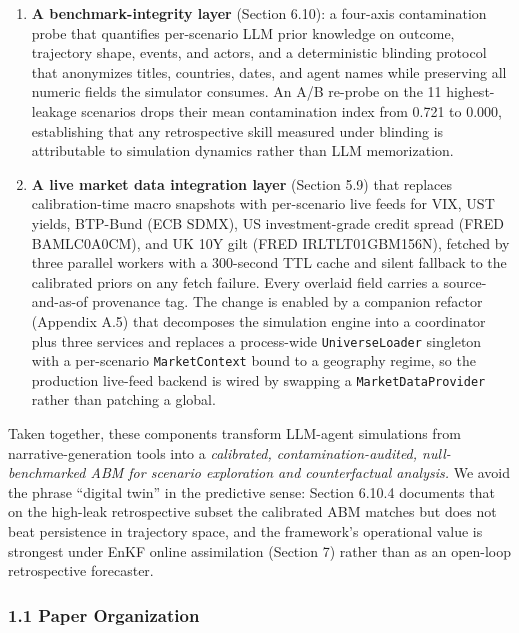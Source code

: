\documentclass[
]{article}
\begin{document}
\begin{enumerate}
  against a fixed reference.
\item
  \textbf{A benchmark-integrity layer} (Section 6.10): a
  four-axis contamination probe that quantifies per-scenario LLM prior
  knowledge on outcome, trajectory shape, events, and actors, and a
  deterministic blinding protocol that anonymizes titles, countries,
  dates, and agent names while preserving all numeric fields the
  simulator consumes. An A/B re-probe on the 11 highest-leakage
  scenarios drops their mean contamination index from 0.721 to 0.000,
  establishing that any retrospective skill measured under blinding is
  attributable to simulation dynamics rather than LLM memorization.
\item
  \textbf{A live market data integration layer} (Section 5.9) that
  replaces calibration-time macro snapshots with per-scenario
  live feeds for VIX, UST yields, BTP-Bund (ECB SDMX), US
  investment-grade credit spread (FRED BAMLC0A0CM), and UK 10Y gilt
  (FRED IRLTLT01GBM156N), fetched by three parallel workers with a
  300-second TTL cache and silent fallback to the calibrated priors on
  any fetch failure. Every overlaid field carries a source-and-as-of
  provenance tag. The change is enabled by a companion refactor
  (Appendix A.5) that decomposes the simulation engine into a
  coordinator plus three services and replaces a process-wide
  \texttt{UniverseLoader} singleton with a per-scenario
  \texttt{MarketContext} bound to a geography regime, so the production
  live-feed backend is wired by swapping a \texttt{MarketDataProvider}
  rather than patching a global.
\end{enumerate}

Taken together, these components transform LLM-agent simulations from
narrative-generation tools into a \emph{calibrated,
contamination-audited, null-benchmarked ABM for scenario exploration and
counterfactual analysis.} We avoid the phrase ``digital twin'' in the
predictive sense: Section 6.10.4 documents that on the high-leak
retrospective subset the calibrated ABM matches but does not beat
persistence in trajectory space, and the framework's operational value
is strongest under EnKF online assimilation (Section 7) rather than as
an open-loop retrospective forecaster.

\subsubsection{1.1 Paper Organization}\label{paper-organization}
\end{document}
